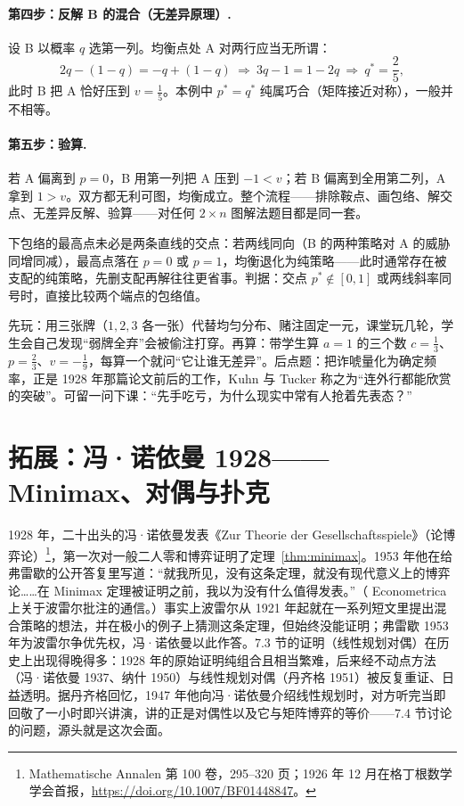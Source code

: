 \paragraph{第四步：反解 B 的混合（无差异原理）.} 设 B 以概率 $q$ 选第一列。均衡点处 A 对两行应当无所谓：
\[
 2q-(1-q)=-q+(1-q)\ \Longrightarrow\ 3q-1=1-2q\ \Longrightarrow\ q^{*}=\frac25,
\]
此时 B 把 A 恰好压到 $v=\tfrac15$。本例中 $p^{*}=q^{*}$ 纯属巧合（矩阵接近对称），一般并不相等。

\paragraph{第五步：验算.} 若 A 偏离到 $p=0$，B 用第一列把 A 压到 $-1<v$；若 B 偏离到全用第二列，A 拿到 $1>v$。双方都无利可图，均衡成立。整个流程——排除鞍点、画包络、解交点、无差异反解、验算——对任何 $2\times n$ 图解法题目都是同一套。

\begin{pitfall}
下包络的最高点未必是两条直线的交点：若两线同向（B 的两种策略对 A 的威胁同增同减），最高点落在 $p=0$ 或 $p=1$，均衡退化为纯策略——此时通常存在被支配的纯策略，先删支配再解往往更省事。判据：交点 $p^{*}\notin[0,1]$ 或两线斜率同号时，直接比较两个端点的包络值。
\end{pitfall}

\begin{teach}[扑克模型的三步讲法]
先玩：用三张牌（$1,2,3$ 各一张）代替均匀分布、赌注固定一元，课堂玩几轮，学生会自己发现“弱牌全弃”会被偷注打穿。再算：带学生算 $a=1$ 的三个数 $c=\tfrac13$、$p=\tfrac23$、$v=-\tfrac19$，每算一个就问“它让谁无差异”。后点题：把诈唬量化为确定频率，正是 1928 年那篇论文前后的工作，Kuhn 与 Tucker 称之为“连外行都能欣赏的突破”。可留一问下课：“先手吃亏，为什么现实中常有人抢着先表态？”
\end{teach}
\section{拓展：冯·诺依曼 1928——Minimax、对偶与扑克}
1928 年，二十出头的冯·诺依曼发表《Zur Theorie der Gesellschaftsspiele》（论博弈论）\footnote{Mathematische Annalen 第 100 卷，295--320 页；1926 年 12 月在格丁根数学学会首报，\url{https://doi.org/10.1007/BF01448847}。}，第一次对一般二人零和博弈证明了定理~\ref{thm:minimax}。1953 年他在给弗雷歇的公开答复里写道：“就我所见，没有这条定理，就没有现代意义上的博弈论……在 Minimax 定理被证明之前，我以为没有什么值得发表。”（ Econometrica 上关于波雷尔批注的通信。）事实上波雷尔从 1921 年起就在一系列短文里提出混合策略的想法，并在极小的例子上猜测这条定理，但始终没能证明；弗雷歇 1953 年为波雷尔争优先权，冯·诺依曼以此作答。7.3 节的证明（线性规划对偶）在历史上出现得晚得多：1928 年的原始证明纯组合且相当繁难，后来经不动点方法（冯·诺依曼 1937、纳什 1950）与线性规划对偶（丹齐格 1951）被反复重证、日益透明。据丹齐格回忆，1947 年他向冯·诺依曼介绍线性规划时，对方听完当即回敬了一小时即兴讲演，讲的正是对偶性以及它与矩阵博弈的等价——7.4 节讨论的问题，源头就是这次会面。

